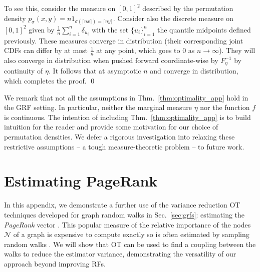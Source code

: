 To see this, consider the measure on $[0,1]^2$ described by the permutation density $p_\sigma(x,y) = n 1_{\sigma(\lceil nx \rceil) = \lceil ny \rceil}$.
Consider also the discrete measure on $[0,1]^2$ given by
$\frac{1}{n} \sum_{i=1}^n \delta_{u_i}$ with the set $\{u_i\}_{i=1}^n$ the quantile midpoints defined previously. 
These measures converge in distribution (their corresponding joint CDFs can differ by at most $\frac{1}{n}$ at any point, which goes to $0$ as $n\to\infty$).
They will also converge in distribution when pushed forward coordinate-wise by $F_\eta^{-1}$ by continuity of $\eta$.
It follows that at asymptotic $n$  and \smash{$\mu^{(\sigma)}$} converge in distribution, which completes the proof. \qed

We remark that not all the assumptions in Thm.~\ref{thm:optimality_app} hold in the GRF setting.
In particular, neither the marginal measure $\eta$ nor the function $f$ is continuous. 
The intention of including Thm.~\ref{thm:optimality_app} is to build intuition for the reader and provide some motivation for our choice of permutation densities.
We defer a rigorous investigation into relaxing these restrictive assumptions -- a tough measure-theoretic problem -- to future work. 

\section{Estimating PageRank}\label{app:pagerank}
In this appendix, we demonstrate a further use of the variance reduction OT techniques developed for graph random walks in Sec.~\ref{sec:grfs}: estimating the \emph{PageRank} vector \citep{page1998pagerank}.
This popular measure of the relative importance of the nodes $\mathcal{N}$ of a graph is expensive to compute exactly so is often estimated by sampling random walks \citep{fogaras2005towards}.
We will show that OT can be used to find a coupling between the walks to reduce the estimator variance, demonstrating the versatility of our approach beyond improving RFs. 

